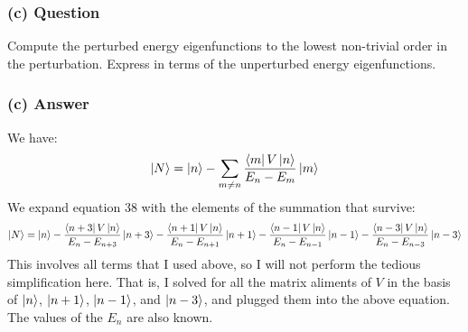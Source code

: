 \documentclass{article}
\begin{document}
\subsubsection*{(c) Question}
Compute the perturbed energy eigenfunctions to the lowest non-trivial order in the perturbation. Express in terms of the unperturbed energy eigenfunctions.

\subsubsection*{(c) Answer}
We have:
\begin{equation}
    \ket{N}= \ket{n} - \sum_{m \neq n} \frac{\bra{m}V\ket{n}}{E_n - E_m} \ket{m}
\end{equation}
We expand equation 38 with the elements of the summation that survive:
\begin{align}
    \ket{N} &= \ket{n} - \frac{\bra{n+3}V\ket{n}}{E_n - E_{n+3}} \ket{n+3} - \frac{\bra{n+1}V\ket{n}}{E_n - E_{n+1}} \ket{n+1} - \frac{\bra{n-1}V\ket{n}}{E_n - E_{n-1}} \ket{n-1} - \frac{\bra{n-3}V\ket{n}}{E_n - E_{n-3}} \ket{n-3} \\
\end{align}
This involves all terms that I used above, so I will not perform the tedious simplification here. That is, I solved for all the matrix aliments of $V$ in the basis of $\ket{n}$, $\ket{n+1}$, $\ket{n-1}$, and $\ket{n-3}$, and plugged them into the above equation. The values of the $E_n$ are also known. 
\end{document}
